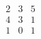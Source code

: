 \documentclass{article}
\begin{document}
	\begin{equation}
		\begin{matrix}
		2 & 3 & 5\\ 4 & 3 & 1 \\ 1 & 0 & 1 
	\end{matrix}
   \end{equation}
\end{document}
